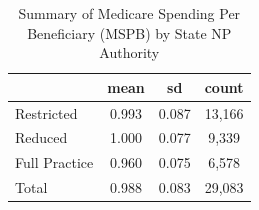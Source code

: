 \begin{table}[htbp]\centering
\def\sym#1{\ifmmode^{#1}\else\(^{#1}\)\fi}
\caption{Summary of Medicare Spending Per Beneficiary (MSPB) by State NP Authority}
\begin{tabular}{l*{1}{ccc}}
\toprule
                    &        mean&          sd&       count\\
\midrule
Restricted          &       0.993&       0.087&      13,166\\
Reduced             &       1.000&       0.077&       9,339\\
Full Practice       &       0.960&       0.075&       6,578\\
Total               &       0.988&       0.083&      29,083\\
\bottomrule
\end{tabular}
\end{table}
